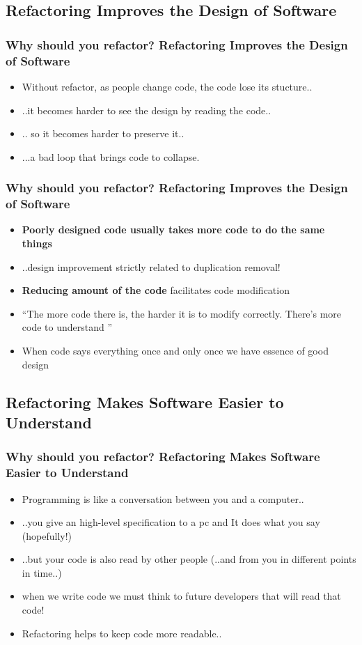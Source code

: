 \documentclass{beamer}
\begin{document}
\subsection{Refactoring Improves the Design of Software}
\begin{frame}
  \frametitle{Why should you refactor? \textbf{Refactoring Improves the Design of Software}} 
  \begin{itemize}
  		\item<+-> Without refactor, as people change code, the code lose its stucture..
		\item<+-> ..it becomes harder to see the design by reading the code.. 
		\item<+-> .. so it becomes harder to preserve it.. 
		\item<+-> ...a bad loop that brings code to collapse. 
  \end{itemize}
\end{frame}

\begin{frame}
  \frametitle{Why should you refactor? \textbf{Refactoring Improves the Design of Software}} 
  \begin{itemize}
  		\item<+-> \textbf{Poorly designed code usually takes more code to do the same things}
		\item<+-> ..design improvement strictly related to duplication removal!
		\item<+-> \textbf{Reducing amount of the code} facilitates code modification
		\item<+-> ``The more code there is, the harder it is to modify correctly. There's more code to understand ''
		\item<+-> When code says everything once and only once we have essence of good design
  \end{itemize}
\end{frame}

\subsection{Refactoring Makes Software Easier to Understand}
\begin{frame}
  \frametitle{Why should you refactor? \textbf{Refactoring Makes Software Easier to Understand}} 
  \begin{itemize}
  		\item<+-> Programming is like a conversation between you and a computer..
		\item<+-> ..you give an high-level specification to a pc and It does what you say (hopefully!)
		\item<+-> ..but your code is also read by other people (..and from you in different points in time..)
		\item<+-> when we write code we must think to future developers that will read that code!
		\item<+-> Refactoring helps to keep code more readable..
  \end{itemize}
\end{frame}
\end{document}
